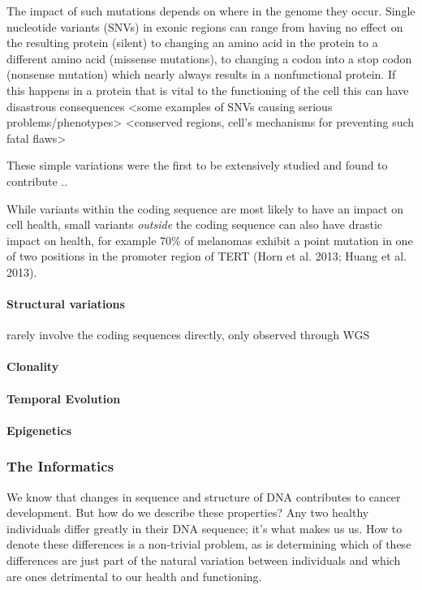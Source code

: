The impact of such mutations depends on where in the genome they occur. Single nucleotide variants (SNVs) in exonic regions can range from having no effect on the resulting protein (silent) to changing an amino acid in the protein to a different amino acid (missense mutations), to changing a codon into a stop codon (nonsense mutation) which nearly always results in a nonfunctional protein. If this happens in a protein that is vital to the functioning of the cell this can have disastrous consequences <some examples of SNVs causing serious problems/phenotypes> <conserved regions, cell's mechanisms for preventing such fatal flaws>

These simple variations were the first to be extensively studied and found to contribute ..

While variants within the coding sequence are most likely to have an impact on cell health, small variants \emph{outside} the coding sequence can also have drastic impact on health, for example 70\% of melanomas exhibit a point mutation in one of two positions in the promoter region of TERT (Horn et al. 2013; Huang et al. 2013).

\paragraph{Structural variations}
rarely involve the coding sequences directly, only observed through WGS
\paragraph{Clonality}
\paragraph{Temporal Evolution}
\paragraph{Epigenetics}

\subsubsection{The Informatics}

We know that changes in sequence and structure of DNA contributes to cancer development. But how do we describe these properties? Any two healthy individuals differ greatly in their DNA sequence; it's what makes us us. How to denote these differences is a non-trivial problem, as is determining which of these differences are just part of the natural variation between individuals and which are ones detrimental to our health and functioning.

